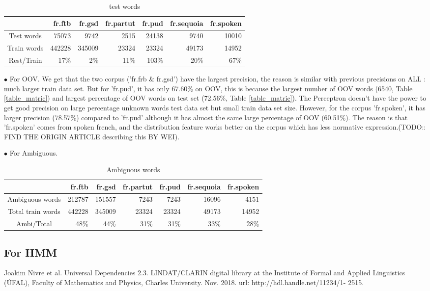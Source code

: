 \documentclass{article}
\begin{document}
\begin{table}[h]
\caption{test words}
\vspace{5pt}
\centering
\begin{tabular}{|c|r|r|r|r|r|r|}
\hline
\ & fr.ftb & fr.gsd & fr.partut & fr.pud & fr.sequoia & fr.spoken \\
\hline
Test words & 75073 & 9742 & 2515 & 24138 & 9740 & 10010 \\
\hline
Train words & 442228 & 345009 & 23324 & 23324 & 49173 & 14952 \\
\hline
Rest/Train & 17\% & 2\% & 11\% & 103\% & 20\% & 67\%\\  
\hline
\end{tabular}
\label{test_on_train}
\end{table}


$\bullet$ For OOV. We get that the two corpus ('fr.frb \& fr.gsd') have the largest precision, the reason is similar with previous precisions on ALL : much larger train data set. But for 'fr.pud', it has only 67.60\% on OOV, this is because the largest number of OOV words (6540, Table \ref{table_matric}) and largest percentage of OOV words on test set (72.56\%, Table  \ref{table_matric}). The Perceptron doesn't have the power to get good precision on large percentage unknown words test data set but small train data set size. However, for the corpus 'fr.spoken', it has larger precision (78.57\%) compared to 'fr.pud' although it has almost the same large percentage of OOV (60.51\%). The reason is that 'fr.spoken' comes from spoken french, and the distribution feature works better on the corpus which has less normative expression.(TODO:: FIND THE ORIGIN ARTICLE describing this BY WEI). 

$\bullet$ For Ambiguous.



\begin{table}[h]
\caption{Ambiguous words}
\vspace{5pt}
\centering
\begin{tabular}{|c|r|r|r|r|r|r|}
\hline
\ & fr.ftb & fr.gsd & fr.partut & fr.pud & fr.sequoia & fr.spoken \\
\hline
Ambiguous words & 212787 & 151557 & 7243 & 7243 & 16096 & 4151 \\
\hline
Total train words & 442228 & 345009 & 23324 & 23324 & 49173 & 14952 \\
\hline
Ambi/Total & 48\% & 44\% & 31\% & 31\% & 33\% & 28\%\\  
\hline
\end{tabular}
\end{table}

\subsection{For HMM}

 
% 


Joakim Nivre et al. Universal Dependencies 2.3. LINDAT/CLARIN digital library at
the Institute of Formal and Applied Linguistics (ÚFAL), Faculty of Mathematics and
Physics, Charles University. Nov. 2018. url: http://hdl.handle.net/11234/1-
2515.
\end{document}

